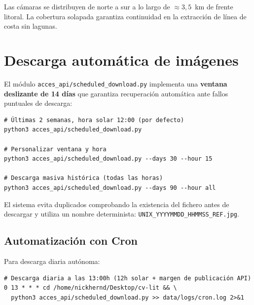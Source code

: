 Las cámaras se distribuyen de norte a sur a lo largo de $\approx 3{,}5$~km de frente litoral.
La cobertura solapada garantiza continuidad en la extracción de línea de costa sin lagunas.

\section{Descarga automática de imágenes}

El módulo \texttt{acces\_api/scheduled\_download.py} implementa una \textbf{ventana deslizante de
14 días} que garantiza recuperación automática ante fallos puntuales de descarga:

\begin{codebox}
\begin{verbatim}
# Últimas 2 semanas, hora solar 12:00 (por defecto)
python3 acces_api/scheduled_download.py

# Personalizar ventana y hora
python3 acces_api/scheduled_download.py --days 30 --hour 15

# Descarga masiva histórica (todas las horas)
python3 acces_api/scheduled_download.py --days 90 --hour all
\end{verbatim}
\end{codebox}

El sistema evita duplicados comprobando la existencia del fichero antes de descargar y utiliza
un nombre determinista: \texttt{UNIX\_YYYYMMDD\_HHMMSS\_REF.jpg}.

\subsection{Automatización con Cron}

Para descarga diaria autónoma:

\begin{codebox}
\begin{verbatim}
# Descarga diaria a las 13:00h (12h solar + margen de publicación API)
0 13 * * * cd /home/nickhernd/Desktop/cv-lit && \
  python3 acces_api/scheduled_download.py >> data/logs/cron.log 2>&1
\end{verbatim}
\end{codebox}

